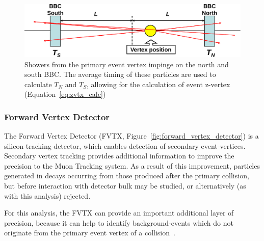 \begin{figure}[ht]
  \centering
  \includegraphics[width=\linewidth]{./figures/bbc_vertex_reconstruction.pdf}
  \caption{
    Showers from the primary event vertex impinge on the north and south BBC.
    The average timing of these particles are used to calculate $T_N$ and $T_S$,
    allowing for the calculation of event z-vertex (Equation~\ref{eq:zvtx_calc})
  }
  \label{fig:bbc_vertex_reconstruction}
\end{figure}

\clearpage
\subsubsection{Forward Vertex Detector}
\label{sec:forward_vertex_detector}

The Forward Vertex Detector (FVTX, Figure~\ref{fig:forward_vertex_detector}) is
a silicon tracking detector, which enables detection of secondary
event-vertices.  Secondary vertex tracking provides additional information to
improve the precision to the Muon Tracking system. As a result of this
improvement, particles generated in decays occurring from those produced
after the primary collision, but before interaction with detector bulk may be
studied, or alternatively (as with this analysis) rejected.

For this analysis, the FVTX can provide an important additional layer of
precision, because it can help to identify background-events which do not
originate from the primary event vertex of a collision~\cite{Aidala2014}.  

